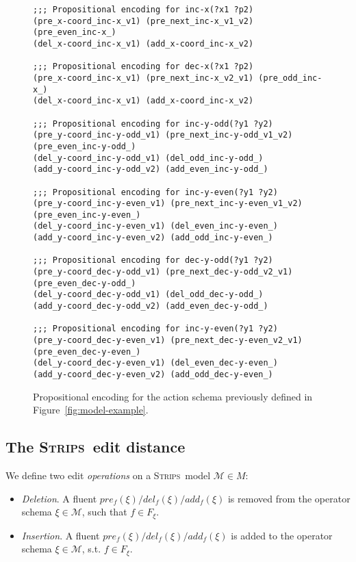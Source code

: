 \documentclass[letterpaper]{article} %
\newcommand{\strips}{\textsc{Strips}}     %
\begin{document}
\begin{figure}
\begin{tiny}
\begin{verbatim}
;;; Propositional encoding for inc-x(?x1 ?p2)
(pre_x-coord_inc-x_v1) (pre_next_inc-x_v1_v2) (pre_even_inc-x_)
(del_x-coord_inc-x_v1) (add_x-coord_inc-x_v2)

;;; Propositional encoding for dec-x(?x1 ?p2)
(pre_x-coord_inc-x_v1) (pre_next_inc-x_v2_v1) (pre_odd_inc-x_)
(del_x-coord_inc-x_v1) (add_x-coord_inc-x_v2)

;;; Propositional encoding for inc-y-odd(?y1 ?y2)
(pre_y-coord_inc-y-odd_v1) (pre_next_inc-y-odd_v1_v2) 
(pre_even_inc-y-odd_)
(del_y-coord_inc-y-odd_v1) (del_odd_inc-y-odd_)
(add_y-coord_inc-y-odd_v2) (add_even_inc-y-odd_)

;;; Propositional encoding for inc-y-even(?y1 ?y2)
(pre_y-coord_inc-y-even_v1) (pre_next_inc-y-even_v1_v2)
(pre_even_inc-y-even_)
(del_y-coord_inc-y-even_v1) (del_even_inc-y-even_)
(add_y-coord_inc-y-even_v2) (add_odd_inc-y-even_)

;;; Propositional encoding for dec-y-odd(?y1 ?y2)
(pre_y-coord_dec-y-odd_v1) (pre_next_dec-y-odd_v2_v1)
(pre_even_dec-y-odd_)
(del_y-coord_dec-y-odd_v1) (del_odd_dec-y-odd_)
(add_y-coord_dec-y-odd_v2) (add_even_dec-y-odd_)

;;; Propositional encoding for inc-y-even(?y1 ?y2)
(pre_y-coord_dec-y-even_v1) (pre_next_dec-y-even_v2_v1)
(pre_even_dec-y-even_)
(del_y-coord_dec-y-even_v1) (del_even_dec-y-even_)
(add_y-coord_dec-y-even_v2) (add_odd_dec-y-even_)

\end{verbatim}
\end{tiny}
 \caption{\small Propositional encoding for the action schema previously defined in Figure~\ref{fig:model-example}.}
\label{fig:encoding}
\end{figure}


\subsection{The \strips\ edit distance}
We define two edit \emph{operations} on a \strips\ model $\mathcal{M}\in M$:
\begin{itemize}
\item {\em Deletion}. A fluent $pre_f(\xi)/del_f(\xi)/add_f(\xi)$ is removed from the operator schema $\xi\in\mathcal{M}$, such that $f\in F_{\xi}$.
\item {\em Insertion}. A fluent $pre_f(\xi)/del_f(\xi)/add_f(\xi)$ is added to the operator schema $\xi\in\mathcal{M}$, s.t. $f\in F_{\xi}$.
\end{itemize}
\end{document}
